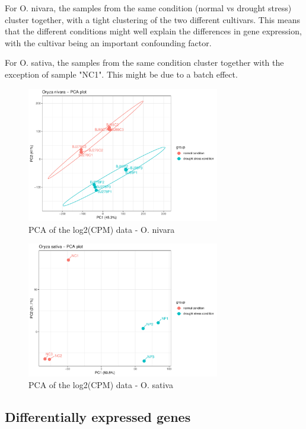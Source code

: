 For O. nivara, the samples from the same condition (normal vs drought stress) cluster together, with a tight clustering of the two different cultivars. This means that the different conditions might well explain the differences in gene expression, with the cultivar being an important confounding factor.

For O. sativa, the samples from the same condition cluster together with the exception of sample "NC1". This might be due to a batch effect.

\begin{figure}[htbp]
    \caption{PCA of the log2(CPM) data - O. nivara}
    \label{fig:3.2-PCA-Oryza_nivara}
    \includegraphics[width=0.75\textwidth]{../../results/plots-and-tables/3.2-PCA-Oryza_nivara}
\end{figure}

\begin{figure}[htbp]
    \caption{PCA of the log2(CPM) data - O. sativa}
    \label{fig:3.2-PCA-Oryza_sativa}
    \includegraphics[width=0.75\textwidth]{../../results/plots-and-tables/3.2-PCA-Oryza_sativa}
\end{figure}


\subsection{Differentially expressed genes}

